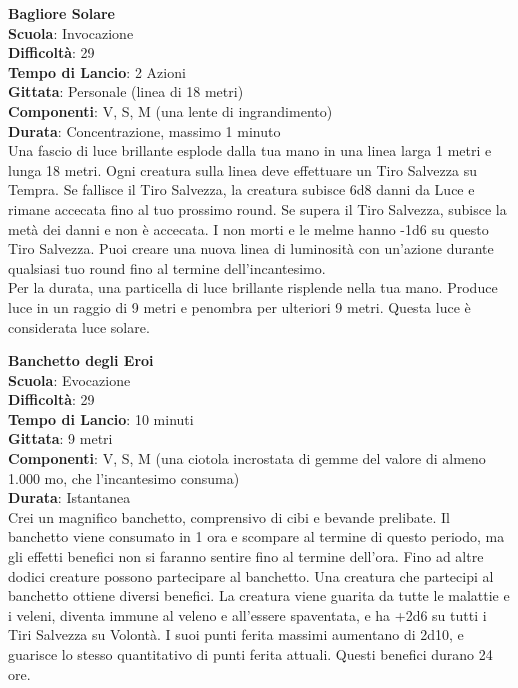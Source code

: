 \begin{multicols}{2}
\medskip\textbf{Bagliore Solare}\\
\textbf{Scuola}: Invocazione\\
\textbf{Difficoltà}: 29\\
\textbf{Tempo di Lancio}: 2 Azioni\\
\textbf{Gittata}: Personale (linea di 18 metri)\\
\textbf{Componenti}: V, S, M (una lente di ingrandimento)\\
\textbf{Durata}: Concentrazione, massimo 1 minuto\\
Una fascio di luce brillante esplode dalla tua mano in una linea larga 1 metri e lunga 18 metri. Ogni creatura sulla linea deve effettuare un Tiro Salvezza su Tempra. Se fallisce il Tiro Salvezza, la creatura subisce 6d8 danni da Luce e rimane accecata fino al tuo prossimo round. Se supera il Tiro Salvezza, subisce la metà dei danni e non è accecata. I non morti e le melme hanno -1d6 su questo Tiro Salvezza. Puoi creare una nuova linea di luminosità con un'azione durante qualsiasi tuo round fino al termine dell'incantesimo.\\
Per la durata, una particella di luce brillante risplende nella tua mano. Produce luce in un raggio di 9 metri e penombra per ulteriori 9 metri. Questa luce è considerata luce solare.

\medskip\textbf{Banchetto degli Eroi}\\
\textbf{Scuola}: Evocazione\\
\textbf{Difficoltà}: 29\\
\textbf{Tempo di Lancio}: 10 minuti\\
\textbf{Gittata}: 9 metri\\
\textbf{Componenti}: V, S, M (una ciotola incrostata di gemme del valore di almeno 1.000 mo, che l'incantesimo consuma)\\
\textbf{Durata}: Istantanea\\
Crei un magnifico banchetto, comprensivo di cibi e bevande prelibate. Il banchetto viene consumato in 1 ora e scompare al termine di questo periodo, ma gli effetti benefici non si faranno sentire fino al termine dell'ora. Fino ad altre dodici creature possono
partecipare al banchetto. Una creatura che partecipi al banchetto ottiene diversi benefici. La creatura viene guarita da tutte le malattie e i veleni, diventa immune al veleno e all'essere
spaventata, e ha +2d6 su tutti i Tiri Salvezza su Volontà. I suoi punti ferita massimi aumentano di 2d10, e guarisce lo stesso quantitativo di punti ferita attuali. Questi benefici durano 24 ore. 


\end{multicols}
